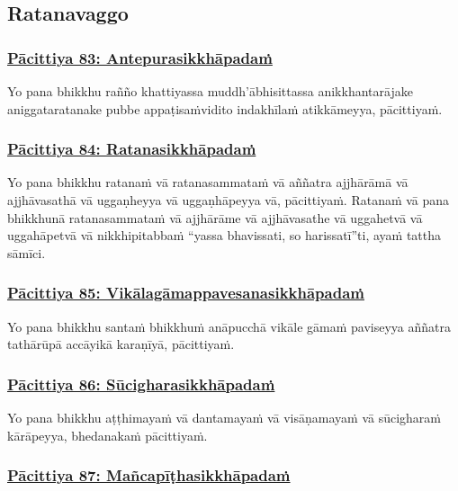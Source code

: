 \subsection{Ratanavaggo}
\vspace{0.2cm}

\subsubsection*{\hyperref[exp83]{Pācittiya 83: Antepurasikkhāpadaṁ}}
\label{pac83}

Yo pana bhikkhu rañño khattiyassa muddh'ābhisittassa anikkhantarājake aniggataratanake pubbe appaṭisaṁvidito indakhīlaṁ atikkāmeyya, pācittiyaṁ.

\subsubsection*{\hyperref[exp84]{Pācittiya 84: Ratanasikkhāpadaṁ}}
\label{pac84}

Yo pana bhikkhu ratanaṁ vā ratanasammataṁ vā aññatra ajjhārāmā vā ajjhāvasathā vā uggaṇheyya vā uggaṇhāpeyya vā, pācittiyaṁ. Ratanaṁ vā pana bhikkhunā ratanasammataṁ vā ajjhārāme vā ajjhāvasathe vā uggahetvā vā uggahāpetvā vā nikkhipitabbaṁ “yassa bhavissati, so harissatī”ti, ayaṁ tattha sāmīci.

\subsubsection*{\hyperref[exp85]{Pācittiya 85: Vikālagāmappavesanasikkhāpadaṁ}}
\label{pac85}

Yo pana bhikkhu santaṁ bhikkhuṁ anāpucchā vikāle gāmaṁ paviseyya aññatra tathārūpā accāyikā karaṇīyā, pācittiyaṁ.

\subsubsection*{\hyperref[exp86]{Pācittiya 86: Sūcigharasikkhāpadaṁ}}
\label{pac86}

Yo pana bhikkhu aṭṭhimayaṁ vā dantamayaṁ vā visāṇamayaṁ vā sūcigharaṁ kārāpeyya, bhedanakaṁ pācittiyaṁ.

\subsubsection*{\hyperref[exp87]{Pācittiya 87: Mañcapīṭhasikkhāpadaṁ}}
\label{pac87}

